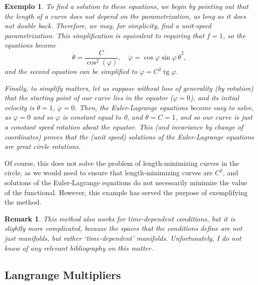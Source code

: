 \documentclass{article}
\theoremstyle{plain}
\theoremstyle{plain}
\newtheorem{remark}{Remark}
\newtheorem{example}{Exemplo}
\theoremstyle{nonumberplain}
\theoremstyle{empty}
\DeclareMathOperator{\tg}{tg}
\begin{document}
\begin{example}
To find a solution to these equations, we begin by pointing out that the length of a curve does not depend on the parametrization, as long as it does not double back. Therefore, we may, for simplicity, find a unit-speed parametrization. This simplification is equivalent to requiring that $f = 1$, so the equations become
\[\dot \theta = \frac C {\cos^2(\varphi)}, \quad \ddot \varphi = \cos\varphi \sin\varphi \, \dot \theta^2,\]
and the second equation can be simplified to $\ddot \varphi = C^2 \tg \varphi$.

Finally, to simplify matters, let us suppose without loss of generality (by rotation) that the starting point of our curve lies in the equator ($\varphi = 0$), and its initial velocity is $\dot\theta = 1$, $\dot \varphi = 0$. Then, the Euler-Lagrange equations become easy to solve, as $\ddot \varphi = 0$ and so $\varphi$ is constant equal to 0, and $\dot \theta = C = 1$, and so our curve is just a constant speed rotation about the equator. This (and invariance by change of coordinates) proves that the (unit speed) solutions of the Euler-Lagrange equations are great circle rotations.
\end{example}

Of course, this does not solve the problem of length-minimizing curves in the circle, as we would need to ensure that length-minimizing curves are $C^2$, and solutions of the Euler-Lagrange equations do not necessarily minimize the value of the functional. However, this example has served the purpose of exemplifying the method.

\begin{remark}
This method also works for time-dependent conditions, but it is slightly more complicated, because the spaces that the conditions define are not just manifolds, but rather `time-dependent' manifolds. Unfortunately, I do not know of any relevant bibliography on this matter.
\end{remark}

\subsection{Langrange Multipliers}
\end{document}
